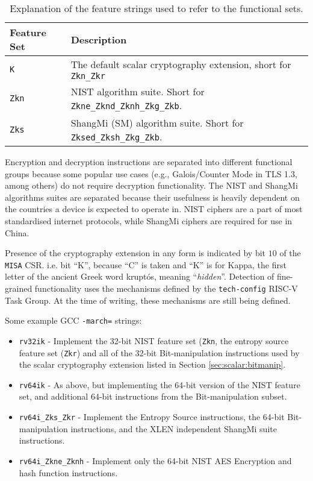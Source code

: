 \begin{table}[h]
\centering
\begin{tabular}{l|l}
Feature Set    & Description \\
\hline
       {\tt  K   }& The default scalar cryptography extension, short for {\tt Zkn\_Zkr}   \\
       {\tt Zkn  }& NIST algorithm suite. Short for {\tt Zkne\_Zknd\_Zknh\_Zkg\_Zkb}.           \\
       {\tt Zks  }& ShangMi (SM) algorithm suite. Short for {\tt Zksed\_Zksh\_Zkg\_Zkb}.   \\
\hline
\end{tabular}
\caption{
    Explanation of the feature strings used to refer to the functional sets.
}
\label{tab:scalar:feature-sets}
\end{table}

Encryption and decryption instructions are separated into different functional
groups because some popular use cases (e.g., Galois/Counter Mode in TLS 1.3, among others)
do not require decryption functionality.
The NIST and ShangMi algorithms suites are separated because their usefulness is
heavily dependent on the countries a device is expected to operate in.
NIST ciphers are a part of most standardised internet protocols, while ShangMi ciphers are
required for use in China.

Presence of the cryptography extension in any form is indicated
by bit $10$ of the {\tt MISA} CSR.
i.e. bit ``K'', because ``C'' is taken and ``K'' is for Kappa, the
first letter of the ancient Greek word kruptós,
meaning ``{\em hidden}''.
Detection of fine-grained functionality uses the mechanisms defined
by the {\tt tech-config} RISC-V Task Group.
At the time of writing, these mechanisms are still being defined.

Some example GCC {\tt -march=} strings:
\begin{itemize}
\item {\tt rv32ik} -
    Implement the 32-bit NIST feature set ({\tt Zkn},
    the entropy source feature set ({\tt Zkr}) and
    all of the 32-bit Bit-manipulation instructions used by the
    scalar cryptography extension listed in Section \ref{sec:scalar:bitmanip}.
\item {\tt rv64ik} -
    As above, but implementing the 64-bit version of the NIST feature set,
    and additional 64-bit instructions from the Bit-manipulation subset.
\item {\tt rv64i\_Zks\_Zkr} -
    Implement the Entropy Source instructions,
    the 64-bit Bit-manipulation instructions,
    and the XLEN independent ShangMi suite instructions.
\item {\tt rv64i\_Zkne\_Zknh} -
    Implement only the 64-bit NIST AES Encryption and hash function instructions.
\end{itemize}

